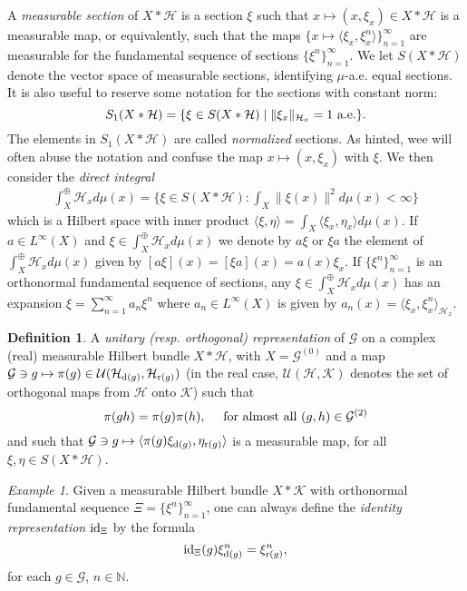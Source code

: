 \documentclass[a4paper,11pt]{article}
\numberwithin{equation}{section}
\theoremstyle{definition}
\newtheorem{defn}[thm]{Definition}
\theoremstyle{remark}
\newtheorem{ex}[thm]{Example}
\numberwithin{equation}{section}
\newcommand{\rG}{\mathcal{G}}
\def\N{\mathbb{N}}
\def\H{\mathcal H}
\def\K{\mathcal K}
\newcommand{\U}{\mathcal{U}}
\def\r{{\rm r}}
\def\d{{\rm d}}
\def\<{\langle}
\def\>{\rangle}
\providecommand{\norm}[1]{\lVert#1\rVert}
\numberwithin{equation}{section}
\begin{document}
A {\it measurable section} of $X \ast \H$ is a section $\xi$ such that $x \mapsto (x,\xi_x) \in X \ast \H$ is a measurable map, or equivalently, such that the maps $\{x \mapsto \<\xi_x, \xi^n_x\>\}_{n = 1}^\infty$ are measurable for the fundamental sequence of sections $\{\xi^n\}_{n = 1}^{\infty}$. We let $S(X \ast \H)$ denote the vector space of measurable sections, identifying $\mu$-a.e. equal sections. It is also useful to reserve some notation for the sections with constant norm: 
$$
S_1(X \ast \H)=\{\xi\in S(X \ast \H) \mid \norm{\xi_x}_{\H_x}=1 \textup{ a.e.}\}.
$$ The elements in $S_1(X \ast \H)$ are called {\it normalized } sections. As hinted, wee will often abuse the notation and confuse the map  $x \mapsto (x, \xi_x)$ with $\xi$.  We then consider the {\it direct integral} 
\begin{align*}
\int_X^{\oplus} \H_x d\mu(x) = \{\xi \in S(X \ast \H) : \int_X \|\xi(x)\|^2 d\mu(x) < \infty\}
\end{align*}
which is a Hilbert space with inner product $\<\xi, \eta\> = \int_X \<\xi_x, \eta_x\> d\mu(x)$. If $a \in L^\infty(X)$ and $\xi \in \int_X^{\oplus} \H_x d\mu(x)$ we denote by $a\xi$ or $\xi a$ the element of $\int_X^{\oplus} \H_x d\mu(x)$ given by $[a\xi](x) = [\xi a](x) = a(x)\xi_x$. If $\{\xi^n\}_{n = 1}^{\infty}$ is an orthonormal fundamental sequence of sections, any $\xi \in \int_X^{\oplus} \H_x d\mu(x)$ has an expansion $\xi = \sum_{n = 1}^\infty a_n\xi^n$ where $a_n\in L^\infty(X)$ is given by $a_n(x) = \<\xi_x, \xi^n_x\>_{\H_x} $. 

\begin{defn}\label{unitaryrep}
A {\it unitary (resp. orthogonal) representation} of $\rG$ on a complex (real) measurable Hilbert bundle $X \ast \H$, with $X=\rG^{(0)}$ and a map $\rG\ni g\mapsto \pi(g) \in \U(\H_{\d(g)}, \H_{\r(g)})$ (in the real case, $\U(\H, \K)$ denotes the set of orthogonal maps from $\H$ onto $\K$) such that
$$
\pi(gh)=\pi(g)\pi(h), \quad\textup{ for almost all } (g,h)\in\rG^{(2)}
$$
and such that $\rG\ni g \mapsto \<\pi(g)\xi_{\d(g)}, \eta_{\r(g)}\>$ is a measurable map, for all $\xi, \eta \in S(X \ast \H)$. 
\end{defn}

\begin{ex}
Given a measurable Hilbert bundle $X \ast \K$ with orthonormal fundamental sequence $\Xi=\{\xi^n\}_{n=1}^\infty$, one can always define the {\it identity representation} ${\rm id}_\Xi$ by the formula 
$$
{\rm id}_\Xi(g)\xi^n_{\d(g)}=\xi^n_{\r(g)},
$$ for each $g\in\rG$, $n\in\N$.
\end{ex}
\end{document}
